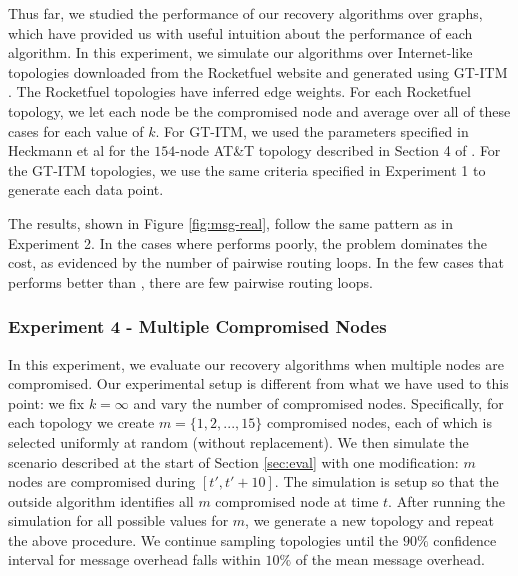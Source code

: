 Thus far, we studied the performance of our recovery algorithms over \er graphs, which have provided us with useful intuition about the performance
of each algorithm. In this experiment, we simulate our algorithms over Internet-like topologies downloaded from the Rocketfuel website \cite{Rocketfuel} and generated using GT-ITM 
\cite{GT-ITM}.  The Rocketfuel topologies have inferred edge weights. For each Rocketfuel topology, we let each node be
the compromised node and average over all of these cases for each value of $k$.  For GT-ITM, we used the parameters specified in Heckmann et al \cite{Heckmann} for  the $154$-node AT\&T topology
described in Section 4 of \cite{Heckmann}. For the GT-ITM topologies, we use the same criteria specified in Experiment 1 to generate each data point. 

The results, shown in Figure \ref{fig:msg-real}, follow the same pattern as in Experiment 2.  
In the cases where \second performs poorly,
the \infinity problem dominates the cost, as evidenced by the number of pairwise routing loops. In the few cases that \second performs better than \purges, there 
are few pairwise routing loops.

\subsubsection{Experiment 4 - Multiple Compromised Nodes}
\label{subsubsec:many}

In this experiment, we evaluate our recovery algorithms when multiple nodes are compromised. Our experimental setup is different from what we have used to this point:
we fix $k=\infty$ and vary the number of compromised nodes. Specifically, for each topology we create $m = \{1,2, ... , 15\}$ compromised nodes, each of which is selected  
uniformly at random (without replacement).  We then simulate the scenario described at the start of Section \ref{sec:eval} with one modification: $m$ nodes are 
compromised during $[t',t'+ 10]$. %
The simulation is setup so that the outside algorithm identifies all $m$ compromised node at time $t$. %
After running the simulation for all possible values for $m$, we generate a new topology and repeat the above procedure. 
We continue sampling topologies until the $90\%$ confidence interval for message overhead falls within $10\%$ of the mean message overhead. 

